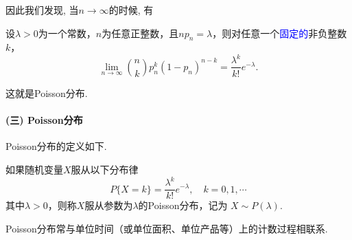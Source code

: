         因此我们发现, 当$n\to\infty$的时候, 有
        \begin{theorem}
            设$\lambda>0$为一个常数，$n$为任意正整数，且$np_n=\lambda$，则对任意一个\textcolor{blue}{固定的}非负整数$k$，
            $$
            \lim_{n\rightarrow \infty}{n\choose k}p_n^k(1-p_n)^{n-k}=\frac{\lambda^k}{k!}e^{-\lambda}.
            $$
            \end{theorem}
        这就是Poisson分布. 

    \paragraph{(三) Poisson分布}
    
            Poisson分布的定义如下. 
        \begin{definition}[Poisson分布]
            如果随机变量$X$服从以下分布律
            \[ P\{X=k\}=\frac{\lambda^k}{k!}e^{-\lambda},\quad k=0,1,\cdots \]
            其中$\lambda>0$，则称$X$服从参数为$\lambda$的Poisson分布，记为
            $X\sim P(\lambda).$
            \end{definition}%
            Poisson分布常与单位时间（或单位面积、单位产品等）上的计数过程相联系.